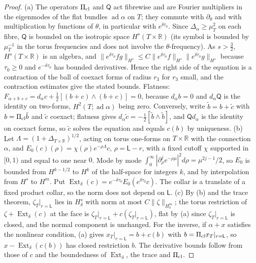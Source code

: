 \documentclass[11pt]{amsart}
\theoremstyle{definition}
\theoremstyle{remark}
\theoremstyle{plain}
\numberwithin{equation}{section}
\newcommand{\RR}{\mathbb{R}}
\newcommand{\ad}{\operatorname{ad}}
\begin{document}
\begin{proof}
(a) The operators $\Pi_{\rm cl}$ and $\mathsf Q$ act fibrewise and are Fourier
multipliers in the eigenmodes of the flat bundles $\ad\alpha$ on $T$; they commute
with $\partial_\theta$ and with multiplication by functions of $\theta$, in particular with
$e^{\delta\tau_0}$. Since $\Delta_\alpha\ge\mu_T^2$ on each fibre, $\mathsf Q$ is bounded on the
isotropic space $H^s(T\times\RR)$ (its symbol is bounded by $\mu_T^{-1}$ in the torus
frequencies and does not involve the $\theta$-frequency). As $s>\frac32$, $H^s(T\times\RR)$ is an algebra, and
$\|e^{\delta\tau_0}fg\|_{H^s}\le C\|e^{\delta\tau_0}f\|_{H^s}\|e^{\delta\tau_0}g\|_{H^s}$ because $\tau_0\ge0$ and
$e^{-\delta\tau_0}$ has bounded derivatives. Hence the right side of the equation is a
contraction of the ball of coexact forms of radius $r_3$ for $r_3$ small, and the
contraction estimates give the stated bounds. Flatness:
$F_{\alpha+b+c}=d_\alpha c+\tfrac12[(b+c)\wedge(b+c)]=0$, because $d_\alpha b=0$ and $d_\alpha\mathsf Q$
is the identity on two-forms, $H^2(T;\ad\alpha)$ being zero. Conversely, write
$\tilde b=b+\tilde c$ with $b=\Pi_{\rm cl}\tilde b$ and $\tilde c$ coexact; flatness gives
$d_\alpha\tilde c=-\tfrac12[\tilde b\wedge\tilde b]$, and $\mathsf Qd_\alpha$ is the identity on
coexact forms, so $\tilde c$ solves the equation and equals $c(b)$ by uniqueness.
(b) Let $\Lambda=(1+\Delta_{T\times\RR})^{1/2}$, acting on torus one-forms on $T\times\RR$ with the
connection $\alpha$, and $E_0(c)(\rho)=\chi(\rho)e^{-\rho\Lambda}c$, $\rho=\mathsf L-r$, with a fixed cutoff
$\chi$ supported in $[0,1)$ and equal to one near $0$. Mode by mode
$\int_0^\infty|\partial_\rho^je^{-\rho\mu}|^2d\rho=\mu^{2j-1}/2$, so $E_0$ is bounded from $H^{k-1/2}$ to
$H^k$ of the half-space for integers $k$, and by interpolation from $H^s$ to $H^m$.
Put $\operatorname{Ext}_\delta(c)=e^{-\delta\tau_0}E_0(e^{\delta\tau_0}c)$. The collar is a translate of a
fixed product collar, so the norm does not depend on $\mathsf L$. (c) By (b) and the trace
theorem, $\zeta_T|_{r=\mathsf L}$ lies in $H^s_\delta$ with norm at most $C\|\zeta\|_{H^m_\delta}$; the torus
restriction of $\zeta+\operatorname{Ext}_\delta(c)$ at the face is $\zeta_T|_{r=\mathsf L}+c(\zeta_T|_{r=\mathsf L})$, flat by
(a) since $\zeta_T|_{r=\mathsf L}$ is closed, and the normal component is unchanged. For the
inverse, if $\alpha+x$ satisfies the nonlinear condition, (a) gives
$x_T|_{r=\mathsf L}=b+c(b)$ with $b=\Pi_{\rm cl}x_T|_{r=\mathsf L}$, so
$x-\operatorname{Ext}_\delta(c(b))$ has closed restriction $b$. The derivative bounds follow
from those of $c$ and the boundedness of $\operatorname{Ext}_\delta$, the trace and
$\Pi_{\rm cl}$.
\end{proof}
\end{document}
